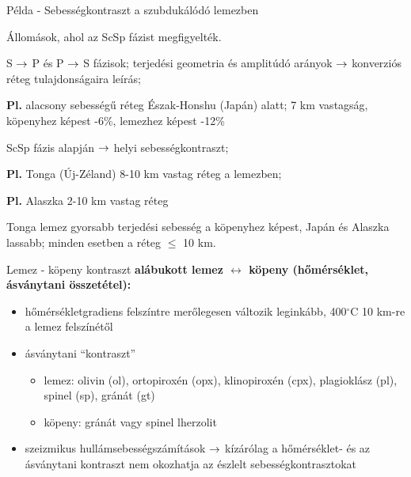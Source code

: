 \documentclass{beamer}
\begin{document}
\begin{frame}{Példa - Sebességkontraszt a szubdukálódó lemezben}
    \begin{minipage}[c]{0.28\textwidth}
        \centering
        
        Állomások, ahol az ScSp fázist megfigyelték.
    \end{minipage}
    \hspace{5pt}
    \begin{minipage}[c]{0.68\textwidth}
        S $\rightarrow$ P és P $\rightarrow$ S fázisok; terjedési geometria és amplitúdó arányok $\rightarrow$ konverziós réteg tulajdonságaira leírás;
        \vspace{5pt}
        
        \textbf{Pl.} alacsony sebességű réteg Észak-Honshu (Japán) alatt; 7 km vastagság, köpenyhez képest -6\%, lemezhez képest -12\%
        \vspace{20pt}
        
        ScSp fázis alapján $\rightarrow$ helyi sebességkontraszt;
        \vspace{5pt}
        
        \textbf{Pl.} Tonga (Új-Zéland) 8-10 km vastag réteg a lemezben;
        
        \textbf{Pl.} Alaszka 2-10 km vastag réteg
        \vspace{10pt}
        
        Tonga lemez gyorsabb terjedési sebesség a köpenyhez képest, Japán és Alaszka lassabb; minden esetben a réteg $\le$ 10 km.
        
    \end{minipage}
\end{frame}


\begin{frame}{Lemez - köpeny kontraszt}
    \textbf{alábukott lemez $\leftrightarrow$ köpeny (hőmérséklet, ásványtani összetétel):}
    \begin{itemize}
        \item hőmérsékletgradiens felszíntre merőlegesen változik leginkább, 400$^\circ$C 10 km-re a lemez felszínétől
        \item ásványtani ``kontraszt''
        \begin{itemize}
            \item lemez: olivin (ol), ortopiroxén (opx), klinopiroxén (cpx), plagioklász (pl), spinel (sp), gránát (gt)
            \item köpeny: gránát vagy spinel lherzolit
        \end{itemize}
        \item szeizmikus hullámsebességszámítások $\rightarrow$ kízárólag a hőmérséklet- és az ásványtani kontraszt nem okozhatja az észlelt sebességkontrasztokat
    \end{itemize}
\end{frame}
\end{document}
